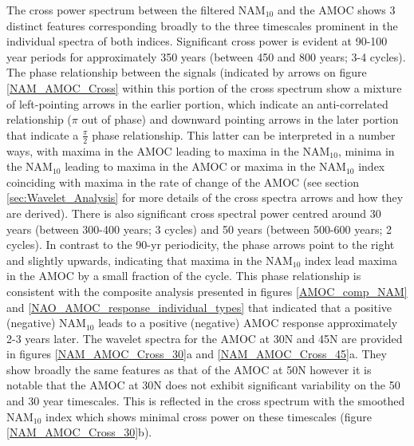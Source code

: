 The cross power spectrum between the filtered NAM$_{10}$ and the AMOC shows 3 distinct features corresponding broadly to the three timescales prominent in the individual spectra of both indices. Significant cross power is evident at 90-100 year periods for approximately 350 years (between 450 and 800 years; 3-4 cycles). The phase relationship between the signals (indicated by arrows on figure \ref{NAM_AMOC_Cross} within this portion of the cross spectrum  show a mixture of left-pointing arrows in the earlier portion, which indicate an anti-correlated relationship  ($\pi$ out of phase) and downward pointing arrows in the later portion that indicate a $\frac{\pi}{2}$ phase relationship. This latter can be interpreted in a number ways, with maxima in the AMOC leading to maxima in the NAM$_{10}$, minima in the NAM$_{10}$ leading to maxima in the AMOC or maxima in the NAM$_{10}$ index coinciding with maxima in the rate of change of the AMOC (see section \ref{sec:Wavelet_Analysis} for more details of the cross spectra arrows and how they are derived). There is also significant cross spectral power centred around 30 years (between 300-400 years; 3 cycles) and 50 years (between 500-600 years; 2 cycles). In contrast to the 90-yr periodicity, the phase arrows point to the right and slightly upwards, indicating that maxima in the NAM$_{10}$ index lead maxima in the AMOC by a small fraction of the cycle. This phase relationship is consistent with the composite analysis presented in figures \ref{AMOC_comp_NAM} and \ref{NAO_AMOC_response_individual_types} that indicated that a positive (negative) NAM$_{10}$ leads to a positive (negative) AMOC response approximately 2-3 years later. The wavelet spectra for the AMOC at 30N and 45N are provided in figures \ref{NAM_AMOC_Cross_30}a and \ref{NAM_AMOC_Cross_45}a. They show broadly the same features as that of the AMOC at 50N however it is notable that the AMOC at 30N does not exhibit significant variability on the 50 and 30 year timescales. This is reflected in the cross spectrum with the smoothed NAM$_{10}$ index which shows minimal cross power on these timescales (figure \ref{NAM_AMOC_Cross_30}b). 

